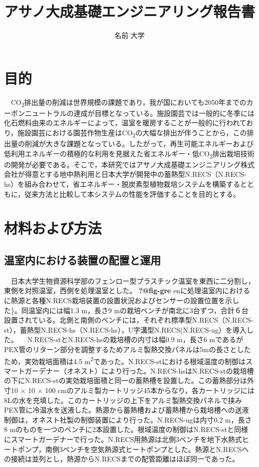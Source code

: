 \documentclass[
  japanese,
  11pt,
  letterpaper,
  DIV=11,
  numbers=noendperiod]{scrartcl}
\title{アサノ大成基礎エンジニアリング報告書}
\author{名前 大学}
\date{}
\begin{document}
\maketitle


\newpage

\section{目的}\label{ux76eeux7684}

　CO\textsubscript{2}排出量の削減は世界規模の課題であり，我が国においても2050年までのカーボンニュートラルの達成が目標となっている。施設園芸では一般的に冬季には化石燃料由来のエネルギーによって，温室を暖房することが一般的に行われており，施設園芸における園芸作物生産はCO\textsubscript{2}の大幅な排出が伴うことから，この排出量の削減が大きな課題となっている。したがって，再生可能エネルギーおよび低利用エネルギーの積極的な利用を見据えた省エネルギー・低CO\textsubscript{2}排出栽培技術の開発が必要である。そこで，本研究ではアサノ大成基礎エンジニアリング株式会社が得意とする地中熱利用と日本大学が開発中の蓄熱型N.RECS（N.RECS-hs）を組み合わせて，省エネルギー・脱炭素型植物栽培システムを構築するとともに，従来方法と比較して本システムの性能を評価することを目的とする。

\section{材料および方法}\label{ux6750ux6599ux304aux3088ux3073ux65b9ux6cd5}

\subsection{温室内における装置の配置と運用}\label{ux6e29ux5ba4ux5185ux306bux304aux3051ux308bux88c5ux7f6eux306eux914dux7f6eux3068ux904bux7528}

　日本大学生物資源科学部のフェンロー型プラスチック温室を東西に二分割し，東側を対照温室，西側を処理温室とした。
\textbf{?@fig-gre}
enに処理温室内におけるに熱源と各種N.RECS栽培装置の設置状況およびセンサーの設置位置を示した\}。同温室内には幅1.3
m，長さ9
mの栽培ベンチが南北に3台ずつ，合計６台設置されている。北側と南側のベンチには，それぞれ標準型N.RECS（N.RECS-st），蓄熱型N.RECS-hs（N.RECS-hs），U字溝型N.RECS(N.RECS-ug）を導入した。
　N.RECS-stとN.RECS-hsの栽培槽の内寸は幅0.9 m，長さ6
mであるがPEX管のリターン部分を調整するためアルミ製熱交換パネルは5mの長さとしたため，実効栽培面積は4.5
m\textsuperscript{2}であった。N.RECS-stにおける根域温度の制御はスマートガーデナー（オネスト）により行った。N.RECS-hsはN.RECS-stの栽培槽の下にN.RECS-stの実効栽培面積と同一の蓄熱槽を設置した。この蓄熱部分は外寸10
× 10 × 100
cmのアルミ製カートリッジ45本からなり，各カートリッジには8Lの水を充填した。このカートリッジの上下をアルミ製熱交換パネルで挟みPEX管に冷温水を送液した。熱源から蓄熱槽および蓄熱槽から栽培槽への送液制御は，オネスト社製の制御装置により行った。N.RECS-ugは内寸0.2
m，長さ8
mのものを一つのベンチに2本設置した。根域温度の制御はN.RECS-stと同様にスマートガーデナーで行った。N.RECS用熱源は北側3ベンチを地下水熱式ヒートポンプ，南側3ベンチを空気熱源式ヒートポンプとした。熱源とN.RECSへの接続は並列とし，熱源からN.RECSまでの配管距離はほぼ同一であった。
\end{document}

